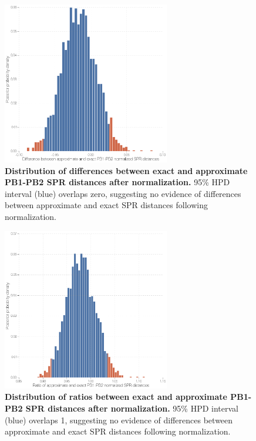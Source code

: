 \documentclass[11pt,oneside,letterpaper]{article}
\begin{document}
\begin{figure}
\centering  
\includegraphics[width=0.65\textwidth]  {supp_figures/InfB_supp_NormPB1-PB2_hist.png}
\caption{\textbf{Distribution of differences between exact and approximate PB1-PB2 SPR distances after normalization.}
95\% HPD interval (blue) overlaps zero, suggesting no evidence of differences between approximate and exact SPR distances following normalization.}
\label{NormSPR_PB1-PB2_difference}
\end{figure}

\begin{figure}
\centering  
\includegraphics[width=0.65\textwidth]  {supp_figures/InfB_supp_NormPB1-PB2_hist2.png}
\caption{\textbf{Distribution of ratios between exact and approximate PB1-PB2 SPR distances after normalization.}
95\% HPD interval (blue) overlaps 1, suggesting no evidence of differences between approximate and exact SPR distances following normalization.}
\label{NormSPR_PB1-PB2_ratio}
\end{figure}
\end{document}
